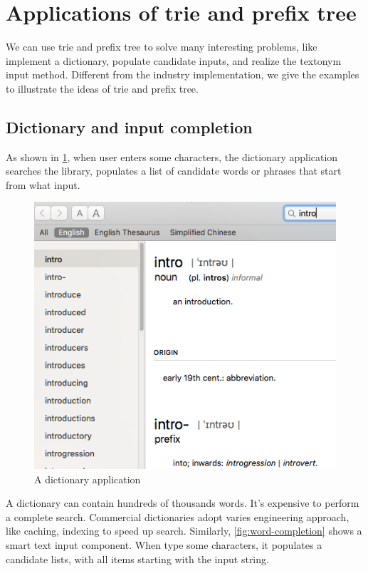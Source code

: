 \documentclass[b5paper]{article}
\begin{document}
\section{Applications of trie and prefix tree}
We can use trie and prefix tree to solve many interesting problems, like implement a dictionary, populate candidate inputs, and realize the textonym input method. Different from the industry implementation, we give the examples to illustrate the ideas of trie and prefix tree.

\subsection{Dictionary and input completion}
As shown in \cref{fig:e-dict}, when user enters some characters, the dictionary application searches the library, populates a list of candidate words or phrases that start from what input.

\begin{figure}[htbp]
  \centering
  \includegraphics[scale=0.4]{img/edict-en}
  \caption{A dictionary application}
  \label{fig:e-dict}
\end{figure}

A dictionary can contain hundreds of thousands words. It's expensive to perform a complete search. Commercial dictionaries adopt varies engineering approach, like caching, indexing to speed up search. Similarly, \cref{fig:word-completion} shows a smart text input component. When type some characters, it populates a candidate lists, with all items starting with the input string.
\end{document}
